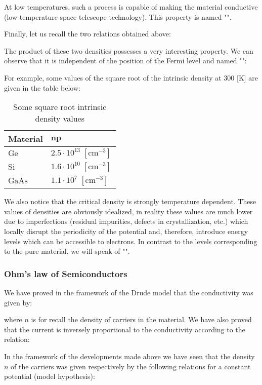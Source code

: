 	At low temperatures, such a process is capable of making the material conductive (low-temperature space telescope technology). This property is named "".

	Finally, let us recall the two relations obtained above:
	
	The product of these two densities possesses a very interesting property. We can observe that it is independent of the position of the Fermi level and named "":
	
	For example, some values of the square root of the intrinsic density at $300$ [K] are given in the table below:
	\begin{table}[H]
		\centering
		\begin{tabular}{|l|l|}
		\hline
		\rowcolor[HTML]{9B9B9B} 
		\textbf{Material} & $\pmb{\bar{n}\bar{p}}$ \\ \hline
		$\mathrm{Ge}$ & $2.5\cdot 10^{13}\;[\text{cm}^{-3}]$ \\ \hline
		$\mathrm{Si}$ & $1.6\cdot 10^{10}\;[\text{cm}^{-3}]$ \\ \hline
		$\mathrm{GaAs}$ & $1.1\cdot 10^{7}\;[\text{cm}^{-3}]$ \\ \hline
		\end{tabular}
		\caption[]{Some square root intrinsic density values}
	\end{table}
	We also notice that the critical density is strongly temperature dependent. These values of densities are obviously idealized, in reality these values are much lower due to imperfections (residual impurities, defects in crystallization, etc.) which locally disrupt the periodicity of the potential and, therefore, introduce energy levels which can be accessible to electrons. In contrast to the levels corresponding to the pure material, we will speak of "".
	
	\subsubsection{Ohm's law of Semiconductors}
	We have proved in the framework of the Drude model that the conductivity was given by:
	
	where $n$ is for recall the density of carriers in the material. We have also proved that the current is inversely proportional to the conductivity according to the relation:
	
	In the framework of the developments made above we have seen that the density $n$ of the carriers was given respectively by the following relations for a constant potential (model hypothesis):
	
